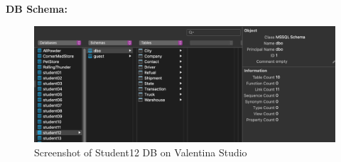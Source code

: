 \documentclass{article}
\begin{document}
\newpage

\textbf{DB Schema:} \newline

\begin{figure}[h]
    \centering
    \includegraphics[width=\textwidth]{images/valentina.png}
    \caption{Screenshot of Student12 DB on Valentina Studio}
    \label{fig:my_label}
\end{figure}
\end{document}
